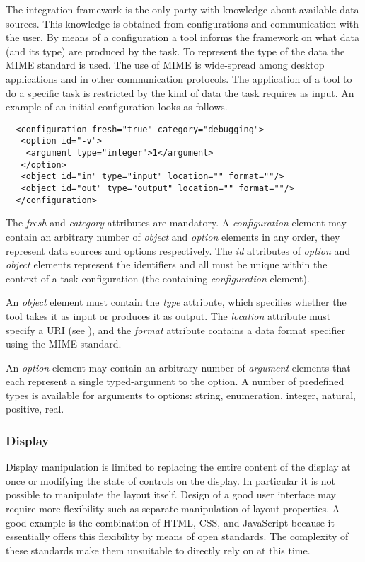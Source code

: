 \documentclass{article}
\begin{document}
   The integration framework is the only party with knowledge about available
   data sources. This knowledge is obtained from configurations and
   communication with the user. By means of a configuration a tool informs the
   framework on what data (and its type) are produced by the task. To represent
   the type of the data the MIME standard is used. The use of MIME is
   wide-spread among desktop applications and in other communication protocols.
   The application of a tool to do a specific task is restricted by the kind of
   data the task requires as input. An example of an initial configuration
   looks as follows.

   \small \begin{verbatim}
  <configuration fresh="true" category="debugging">
   <option id="-v">
    <argument type="integer">1</argument>
   </option>
   <object id="in" type="input" location="" format=""/>
   <object id="out" type="output" location="" format=""/>
  </configuration>\end{verbatim} \normalsize
   \noindent The \textit{fresh} and \textit{category} attributes are mandatory.
   A \textit{configuration} element may contain an arbitrary number of
   \textit{object} and \textit{option} elements in any order, they represent
   data sources and options respectively.  The \textit{id} attributes of
   \textit{option} and \textit{object} elements represent the identifiers and
   all must be unique within the context of a task configuration (the
   containing \textit{configuration} element).

   An \textit{object} element must contain the \textit{type} attribute, which
   specifies whether the tool takes it as input or produces it as output. The
   \textit{location} attribute must specify a URI (see \cite{rfc3305}),
   and the \textit{format} attribute contains a data format specifier
   using the MIME standard.

   An \textit{option} element may contain an arbitrary number of
   \textit{argument} elements that each represent a single typed-argument to
   the option. A number of predefined types is available for arguments to
   options: string, enumeration, integer, natural, positive, real.

  \subsubsection{Display}
   
   Display manipulation is limited to replacing the entire content of the
   display at once or modifying the state of controls on the display.  In
   particular it is not possible to manipulate the layout itself. Design of a
   good user interface may require more flexibility such as separate
   manipulation of layout properties.  A good example is the combination of
   HTML, CSS, and JavaScript because it essentially offers this flexibility by
   means of open standards. The complexity of these standards make them
   unsuitable to directly rely on at this time.
\end{document}
